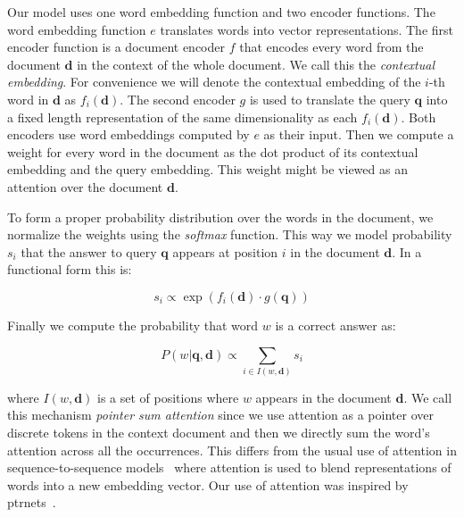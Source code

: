 \documentclass[11pt]{article}
\newcommand{\RUDAA}[1]{{\color{black}#1}}
\newcommand{\ctxTransducer}{f}
\newcommand{\queryEncoder}{g}
\newcommand{\querySeq}{\mathbf{q}}
\newcommand{\queryEmbedded}{e}
\newcommand{\documentSeq}{\mathbf{d}}
\newcommand{\documentTransducedSeq}{D}
\begin{document}
Our model uses one word embedding function and two encoder functions. The word embedding function $e$ translates words into vector representations.
The first encoder function is a document encoder $\ctxTransducer$ that encodes every word from the document $\documentSeq$ in the context of the whole document. We call this the  \emph{contextual embedding}. For convenience we will denote the contextual embedding of the $i$-th word in $\documentSeq$ as $\ctxTransducer_i(\documentSeq)$. 
The second encoder $\queryEncoder$ is used to translate the query $\querySeq$ into a fixed length representation of the same dimensionality as each \RUDAA{$\ctxTransducer_i(\documentSeq)$}. Both encoders use word embeddings computed by $e$ as their input. Then we compute a weight for every word in the document as the dot product of its contextual embedding and the query embedding. 
This weight might be viewed as an attention over the document $\documentSeq$. 


To form a proper probability distribution over the words in the document, we normalize the weights using the \emph{softmax} function.
This way we model probability $s_i$ that the answer to query $\querySeq$ appears at position $i$ in the document $\documentSeq$.  
In a functional form this is:

\begin{equation}
    s_i \propto \exp \left( \ctxTransducer_i(\documentSeq) \cdot \queryEncoder(\querySeq) \right)
    \label{eq:att}
\end{equation}

Finally we compute the probability that word $w$ is a correct answer as:

\begin{equation}
P(w|\querySeq,\documentSeq) \propto \sum_{i \in I(w,\documentSeq)} s_i
\label{eq:probSum}
\end{equation}

where $I(w,\documentSeq)$ is a set of positions where $w$ appears in the document $\documentSeq$.
We call this mechanism \textit{pointer sum attention} since we use attention as a pointer over discrete tokens in the context document and then we directly sum the word's attention across all the occurrences.
This differs from the usual use of attention in sequence-to-sequence models~\cite{Bahdanau2014} where attention is used to blend representations of words into a new embedding vector. 
Our use of attention was inspired by \glspl{ptrnet}~\cite{vinyals2015pointer}.
\end{document}
